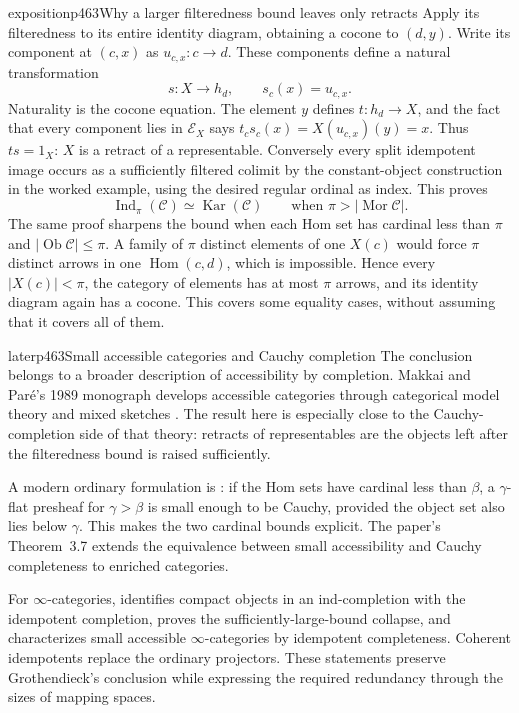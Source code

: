 \begin{dcomment}{exposition}{p463}{Why a larger filteredness bound leaves only retracts}
Apply its filteredness to its entire identity diagram, obtaining a cocone to $(d,y)$. Write its component at $(c,x)$ as $u_{c,x}:c\to d$. These components define a natural transformation
\[
s:X\longrightarrow h_d,\qquad s_c(x)=u_{c,x}.
\]
Naturality is the cocone equation. The element $y$ defines $t:h_d\to X$, and the fact that every component lies in $\mathcal E_X$ says
$t_cs_c(x)=X(u_{c,x})(y)=x$.
Thus $ts=1_X$: $X$ is a retract of a representable. Conversely every split idempotent image occurs as a sufficiently filtered colimit by the constant-object construction in the worked example, using the desired regular ordinal as index. This proves
\[
\operatorname{Ind}_{\pi}(\mathcal C)\simeq
\operatorname{Kar}(\mathcal C)
\qquad\text{when }\pi>|\operatorname{Mor}\mathcal C|.
\]
The same proof sharpens the bound when each Hom set has cardinal less than $\pi$ and $|\operatorname{Ob}\mathcal C|\le\pi$. A family of $\pi$ distinct elements of one $X(c)$ would force $\pi$ distinct arrows in one $\operatorname{Hom}(c,d)$, which is impossible. Hence every $|X(c)|<\pi$, the category of elements has at most $\pi$ arrows, and its identity diagram again has a cocone. This covers some equality cases, without assuming that it covers all of them.
\end{dcomment}


\begin{dcomment}{later}{p463}{Small accessible categories and Cauchy completion}
The conclusion belongs to a broader description of accessibility by completion. Makkai and Par\'e's 1989 monograph develops accessible categories through categorical model theory and mixed sketches \citep{MakkaiPare1989}. The result here is especially close to the Cauchy-completion side of that theory: retracts of representables are the objects left after the filteredness bound is raised sufficiently.

A modern ordinary formulation is \citet[Lemmas~2.5--2.6 and Corollary~2.8]{Tendas2022Continuity}: if the Hom sets have cardinal less than $\beta$, a $\gamma$-flat presheaf for $\gamma>\beta$ is small enough to be Cauchy, provided the object set also lies below $\gamma$. This makes the two cardinal bounds explicit. The paper's Theorem~3.7 extends the equivalence between small accessibility and Cauchy completeness to enriched categories.

For $\infty$-categories, \citet[Lemma~5.4.2.4 and Corollaries~5.4.3.5--5.4.3.6]{Lurie2009HTT} identifies compact objects in an ind-completion with the idempotent completion, proves the sufficiently-large-bound collapse, and characterizes small accessible $\infty$-categories by idempotent completeness. Coherent idempotents replace the ordinary projectors. These statements preserve Grothendieck's conclusion while expressing the required redundancy through the sizes of mapping spaces.
\end{dcomment}


